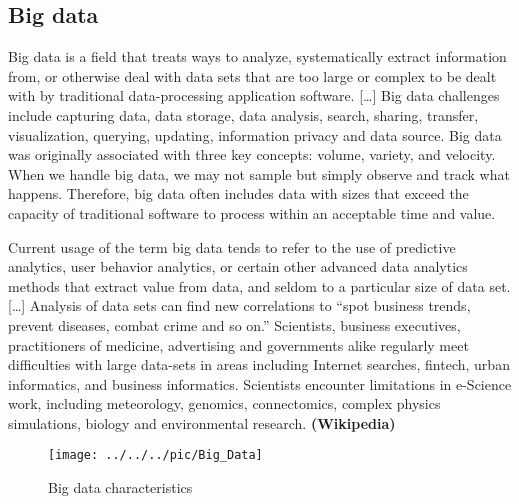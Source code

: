 \subsection{Big data}
Big data is a field that treats ways to analyze, systematically extract information from, or otherwise deal with data sets that are too large or complex to be dealt with by traditional data-processing application software. [\dots]
Big data challenges include capturing data, data storage, data analysis, search, sharing, transfer, visualization, querying, updating, information privacy and data source. Big data was originally associated with three key concepts: volume, variety, and velocity. When we handle big data, we may not sample but simply observe and track what happens. Therefore, big data often includes data with sizes that exceed the capacity of traditional software to process within an acceptable time and value. 

Current usage of the term big data tends to refer to the use of predictive analytics, user behavior analytics, or certain other advanced data analytics methods that extract value from data, and seldom to a particular size of data set. [\dots]
Analysis of data sets can find new correlations to ``spot business trends, prevent diseases, combat crime and so on.'' Scientists, business executives, practitioners of medicine, advertising and governments alike regularly meet difficulties with large data-sets in areas including Internet searches, fintech, urban informatics, and business informatics. Scientists encounter limitations in e-Science work, including meteorology, genomics, connectomics, complex physics simulations, biology and environmental research. \textbf{(Wikipedia)}


\pbn
\begin{figure}[H]
	\begin{center}
		\texttt{[image: ../../../pic/Big\_Data]}
	\end{center}
	\caption{Big data characteristics}
\end{figure}

